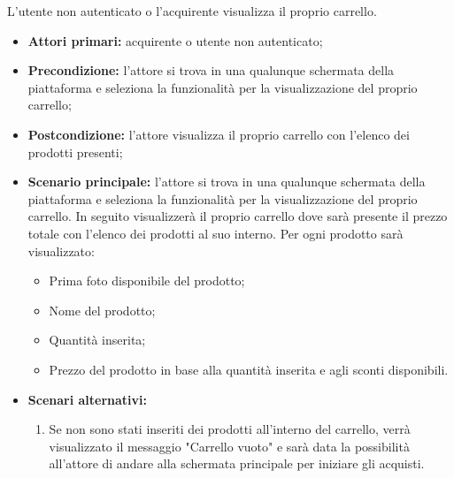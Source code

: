 
\label{visualizzazione-carrello}


L'utente non autenticato o l'acquirente visualizza il proprio carrello.
\begin{itemize}
    \item \textbf{Attori primari:} acquirente o utente non autenticato;
    \item \textbf{Precondizione:} l'attore si trova in una qualunque schermata della piattaforma e seleziona la funzionalità per la visualizzazione del proprio carrello;
    \item \textbf{Postcondizione:} l'attore visualizza il proprio carrello con l'elenco dei prodotti presenti;
    \item \textbf{Scenario principale:} l'attore si trova in una qualunque schermata della piattaforma e seleziona la funzionalità per la visualizzazione del proprio carrello. In seguito visualizzerà il proprio carrello dove sarà presente il prezzo totale con l'elenco dei prodotti al suo interno. Per ogni prodotto sarà visualizzato:
    \begin{itemize}
        \item Prima foto disponibile del prodotto;
        \item Nome del prodotto;
        \item Quantità inserita;
        \item Prezzo del prodotto in base alla quantità inserita e agli sconti disponibili.
    \end{itemize}
    \item \textbf{Scenari alternativi:} 
    \begin{enumerate}[label=\lett]
        \item Se non sono stati inseriti dei prodotti all'interno del carrello, verrà visualizzato il messaggio "Carrello vuoto" e sarà data la possibilità all'attore di andare alla schermata principale per iniziare gli acquisti.
    \end{enumerate}
\end{itemize}


